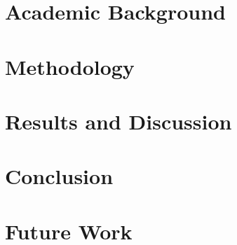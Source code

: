 \documentclass[11pt,a4paper]{report}
\begin{document}
\chapter{Academic Background}


\chapter{Methodology}


\chapter{Results and Discussion}


\chapter{Conclusion}


\chapter{Future Work}

\newpage

\appendix

\end{document}
